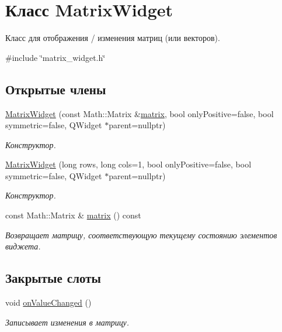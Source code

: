 \hypertarget{class_matrix_widget}{}\section{Класс Matrix\+Widget}
\label{class_matrix_widget}


Класс для отображения / изменения матриц (или векторов).  




{\ttfamily \#include \char`\"{}matrix\+\_\+widget.\+h\char`\"{}}

\subsection*{Открытые члены}
\begin{DoxyCompactItemize}
\item 
\hyperlink{class_matrix_widget_a127414cc00d40d2b62721bcf49286c89}{Matrix\+Widget} (const Math\+::\+Matrix \&\hyperlink{class_matrix_widget_a058562ee7f6d3e1e5671514a39899e3a}{matrix}, bool only\+Positive=false, bool symmetric=false, Q\+Widget $\ast$parent=nullptr)
\begin{DoxyCompactList}\small\item\em Конструктор. \end{DoxyCompactList}\item 
\hyperlink{class_matrix_widget_a3eb9219f9cf1bd7e9569a2557cafbf91}{Matrix\+Widget} (long rows, long cols=1, bool only\+Positive=false, bool symmetric=false, Q\+Widget $\ast$parent=nullptr)
\begin{DoxyCompactList}\small\item\em Конструктор. \end{DoxyCompactList}\item 
\hypertarget{class_matrix_widget_a058562ee7f6d3e1e5671514a39899e3a}{}\label{class_matrix_widget_a058562ee7f6d3e1e5671514a39899e3a} 
const Math\+::\+Matrix \& \hyperlink{class_matrix_widget_a058562ee7f6d3e1e5671514a39899e3a}{matrix} () const
\begin{DoxyCompactList}\small\item\em Возвращает матрицу, соответствующую текущему состоянию элементов виджета. \end{DoxyCompactList}\end{DoxyCompactItemize}
\subsection*{Закрытые слоты}
\begin{DoxyCompactItemize}
\item 
\hypertarget{class_matrix_widget_a0d0d61d1a4cf286f90026d1dfa690121}{}\label{class_matrix_widget_a0d0d61d1a4cf286f90026d1dfa690121} 
void \hyperlink{class_matrix_widget_a0d0d61d1a4cf286f90026d1dfa690121}{on\+Value\+Changed} ()
\begin{DoxyCompactList}\small\item\em Записывает изменения в матрицу. \end{DoxyCompactList}\end{DoxyCompactItemize}
